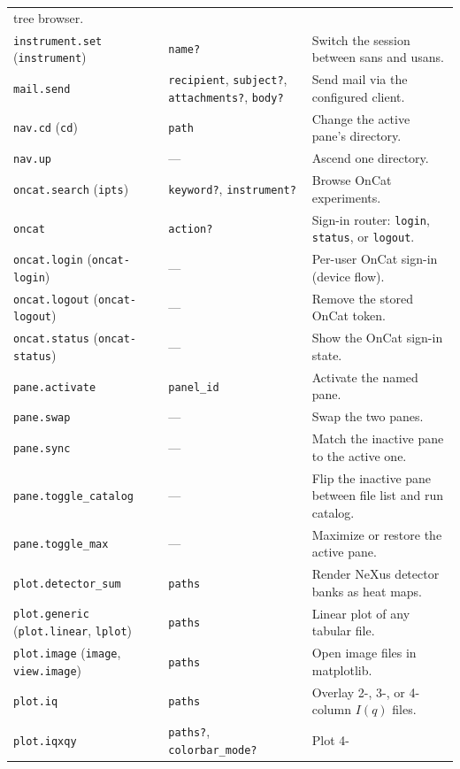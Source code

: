 \documentclass[tm]{ornltm}
\begin{document}
\begin{small}
\begin{longtable}{p{} p{} p{}}
    tree browser. \\
  \texttt{instrument.set} (\texttt{instrument}) & \texttt{name?} & Switch the
    session between \ac{sans} and \ac{usans}. \\
  \texttt{mail.send} & \texttt{recipient}, \texttt{subject?},
    \texttt{attachments?}, \texttt{body?} & Send mail via the configured
    client. \\
  \texttt{nav.cd} (\texttt{cd}) & \texttt{path} & Change the active pane's
    directory. \\
  \texttt{nav.up} & --- & Ascend one directory. \\
  \texttt{oncat.search} (\texttt{ipts}) & \texttt{keyword?},
    \texttt{instrument?} & Browse OnCat experiments. \\
  \texttt{oncat} & \texttt{action?} & Sign-in router: \texttt{login},
    \texttt{status}, or \texttt{logout}. \\
  \texttt{oncat.login} (\texttt{oncat-login}) & --- & Per-user OnCat sign-in
    (device flow). \\
  \texttt{oncat.logout} (\texttt{oncat-logout}) & --- & Remove the stored OnCat
    token. \\
  \texttt{oncat.status} (\texttt{oncat-status}) & --- & Show the OnCat sign-in
    state. \\
  \texttt{pane.activate} & \texttt{panel\_id} & Activate the named pane. \\
  \texttt{pane.swap} & --- & Swap the two panes. \\
  \texttt{pane.sync} & --- & Match the inactive pane to the active one. \\
  \texttt{pane.toggle\_catalog} & --- & Flip the inactive pane between file list
    and run catalog. \\
  \texttt{pane.toggle\_max} & --- & Maximize or restore the active pane. \\
  \texttt{plot.detector\_sum} & \texttt{paths} & Render NeXus detector banks as
    heat maps. \\
  \texttt{plot.generic} (\texttt{plot.linear}, \texttt{lplot}) &
    \texttt{paths} & Linear plot of any tabular file. \\
  \texttt{plot.image} (\texttt{image}, \texttt{view.image}) & \texttt{paths} &
    Open image files in matplotlib. \\
  \texttt{plot.iq} & \texttt{paths} & Overlay 2-, 3-, or 4-column $I(q)$
    files. \\
  \texttt{plot.iqxqy} & \texttt{paths?}, \texttt{colorbar\_mode?} & Plot 4-

\end{longtable}
\end{small}
\end{document}
